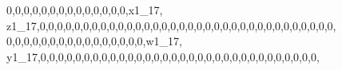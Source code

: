 \documentclass[]{article}
\newenvironment{Shaded}{\begin{snugshade}}{\end{snugshade}}
\newcommand{\DecValTok}[1]{\textcolor[rgb]{0.00,0.00,0.81}{#1}}
\newcommand{\NormalTok}[1]{#1}
\begin{document}
\begin{Shaded}
\begin{Highlighting}[]
\DecValTok{0}\NormalTok{,}\DecValTok{0}\NormalTok{,}\DecValTok{0}\NormalTok{,}\DecValTok{0}\NormalTok{,}\DecValTok{0}\NormalTok{,}\DecValTok{0}\NormalTok{,}\DecValTok{0}\NormalTok{,}\DecValTok{0}\NormalTok{,}\DecValTok{0}\NormalTok{,}\DecValTok{0}\NormalTok{,}\DecValTok{0}\NormalTok{,}\DecValTok{0}\NormalTok{,}\DecValTok{0}\NormalTok{,}\DecValTok{0}\NormalTok{,x1_}\DecValTok{17}\NormalTok{, z1_}\DecValTok{17}\NormalTok{,}\DecValTok{0}\NormalTok{,}\DecValTok{0}\NormalTok{,}\DecValTok{0}\NormalTok{,}\DecValTok{0}\NormalTok{,}\DecValTok{0}\NormalTok{,}\DecValTok{0}\NormalTok{,}\DecValTok{0}\NormalTok{,}\DecValTok{0}\NormalTok{,}\DecValTok{0}\NormalTok{,}\DecValTok{0}\NormalTok{,}\DecValTok{0}\NormalTok{,}\DecValTok{0}\NormalTok{,}\DecValTok{0}\NormalTok{,}\DecValTok{0}\NormalTok{,}\DecValTok{0}\NormalTok{,}\DecValTok{0}\NormalTok{,}\DecValTok{0}\NormalTok{,}\DecValTok{0}\NormalTok{,}\DecValTok{0}\NormalTok{,}\DecValTok{0}\NormalTok{,}\DecValTok{0}\NormalTok{,}\DecValTok{0}\NormalTok{,}\DecValTok{0}\NormalTok{,}\DecValTok{0}\NormalTok{,}\DecValTok{0}\NormalTok{,}\DecValTok{0}\NormalTok{,}\DecValTok{0}\NormalTok{,}\DecValTok{0}\NormalTok{,}\DecValTok{0}\NormalTok{,}\DecValTok{0}\NormalTok{,}\DecValTok{0}\NormalTok{,}\DecValTok{0}\NormalTok{,}\DecValTok{0}\NormalTok{,}\DecValTok{0}\NormalTok{,}
\DecValTok{0}\NormalTok{,}\DecValTok{0}\NormalTok{,}\DecValTok{0}\NormalTok{,}\DecValTok{0}\NormalTok{,}\DecValTok{0}\NormalTok{,}\DecValTok{0}\NormalTok{,}\DecValTok{0}\NormalTok{,}\DecValTok{0}\NormalTok{,}\DecValTok{0}\NormalTok{,}\DecValTok{0}\NormalTok{,}\DecValTok{0}\NormalTok{,}\DecValTok{0}\NormalTok{,}\DecValTok{0}\NormalTok{,}\DecValTok{0}\NormalTok{,}\DecValTok{0}\NormalTok{,}\DecValTok{0}\NormalTok{,w1_}\DecValTok{17}\NormalTok{, y1_}\DecValTok{17}\NormalTok{,}\DecValTok{0}\NormalTok{,}\DecValTok{0}\NormalTok{,}\DecValTok{0}\NormalTok{,}\DecValTok{0}\NormalTok{,}\DecValTok{0}\NormalTok{,}\DecValTok{0}\NormalTok{,}\DecValTok{0}\NormalTok{,}\DecValTok{0}\NormalTok{,}\DecValTok{0}\NormalTok{,}\DecValTok{0}\NormalTok{,}\DecValTok{0}\NormalTok{,}\DecValTok{0}\NormalTok{,}\DecValTok{0}\NormalTok{,}\DecValTok{0}\NormalTok{,}\DecValTok{0}\NormalTok{,}\DecValTok{0}\NormalTok{,}\DecValTok{0}\NormalTok{,}\DecValTok{0}\NormalTok{,}\DecValTok{0}\NormalTok{,}\DecValTok{0}\NormalTok{,}\DecValTok{0}\NormalTok{,}\DecValTok{0}\NormalTok{,}\DecValTok{0}\NormalTok{,}\DecValTok{0}\NormalTok{,}\DecValTok{0}\NormalTok{,}\DecValTok{0}\NormalTok{,}\DecValTok{0}\NormalTok{,}\DecValTok{0}\NormalTok{,}\DecValTok{0}\NormalTok{,}\DecValTok{0}\NormalTok{,}\DecValTok{0}\NormalTok{,}\DecValTok{0}\NormalTok{,}

\end{Highlighting}
\end{Shaded}
\end{document}
